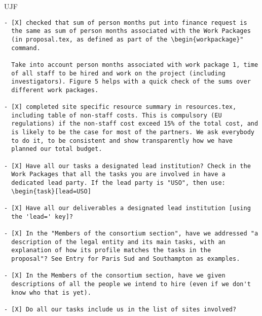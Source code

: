 \begin{sitedescription}{UJF}
\end{sitedescription}



\begin{draft}
\vspace{1cm}

\begin{verbatim}
- [X] checked that sum of person months put into finance request is
  the same as sum of person months associated with the Work Packages
  (in proposal.tex, as defined as part of the \begin{workpackage}"
  command.
  
  Take into account person months associated with work package 1, time
  of all staff to be hired and work on the project (including
  investigators). Figure 5 helps with a quick check of the sums over
  different work packages.

- [X] completed site specific resource summary in resources.tex,
  including table of non-staff costs. This is compulsory (EU
  regulations) if the non-staff cost exceed 15% of the total cost, and
  is likely to be the case for most of the partners. We ask everybody
  to do it, to be consistent and show transparently how we have
  planned our total budget.

- [X] Have all our tasks a designated lead institution? Check in the
  Work Packages that all the tasks you are involved in have a
  dedicated lead party. If the lead party is "USO", then use:
  \begin{task}[lead=USO]

- [X] Have all our deliverables a designated lead institution [using
  the 'lead=' key]?

- [X] In the "Members of the consortium section", have we addressed "a
  description of the legal entity and its main tasks, with an
  explanation of how its profile matches the tasks in the
  proposal"? See Entry for Paris Sud and Southampton as examples.

- [X] In the Members of the consortium section, have we given
  descriptions of all the people we intend to hire (even if we don't
  know who that is yet). 
  
- [X] Do all our tasks include us in the list of sites involved?
\end{verbatim}
\end{draft}





